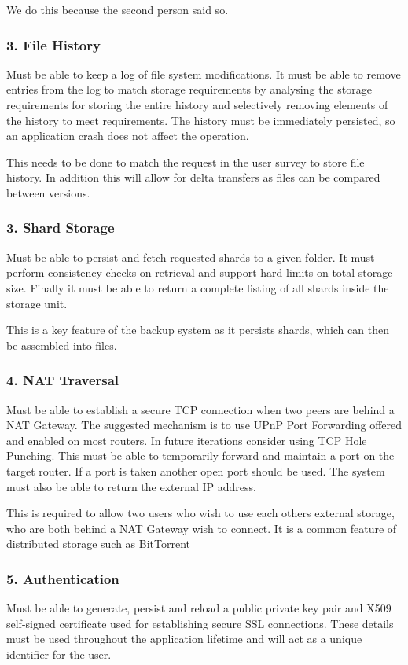 \documentclass[11pt, a4paper, twocolumn, twoside]{report}
\begin{document}
We do this because the second person said so. 

\subsubsection{3. File History}
Must be able to keep a log of file system modifications. It must be able to remove entries from the log to match storage requirements by analysing the storage requirements for storing the entire history and selectively removing elements of the history to meet requirements. The history must be immediately persisted, so an application crash does not affect the operation.

This needs to be done to match the request in the user survey to store file history. In addition this will allow for delta transfers as files can be compared between versions.

\subsubsection{3. Shard Storage}
Must be able to persist and fetch requested shards to a given folder. It must perform consistency checks on retrieval and support hard limits on total storage size. Finally it must be able to return a complete listing of all shards inside the storage unit.

This is a key feature of the backup system as it persists shards, which can then be assembled into files.

\subsubsection{4. NAT Traversal}
Must be able to establish a secure TCP connection when two peers are behind a NAT Gateway. The suggested mechanism is to use UPnP Port Forwarding offered and enabled on most routers. In future iterations consider using TCP Hole Punching. This must be able to temporarily forward and maintain a port on the target router. If a port is taken another open port should be used. The system must also be able to return the external IP address.

This is required to allow two users who wish to use each others external storage, who are both behind a NAT Gateway wish to connect. It is a common feature of distributed storage such as BitTorrent

\subsubsection{5. Authentication}
Must be able to generate, persist and reload a public private key pair and X509 self-signed certificate used for establishing secure SSL connections. These details must be used throughout the application lifetime and will act as a unique identifier for the user.
\end{document}
